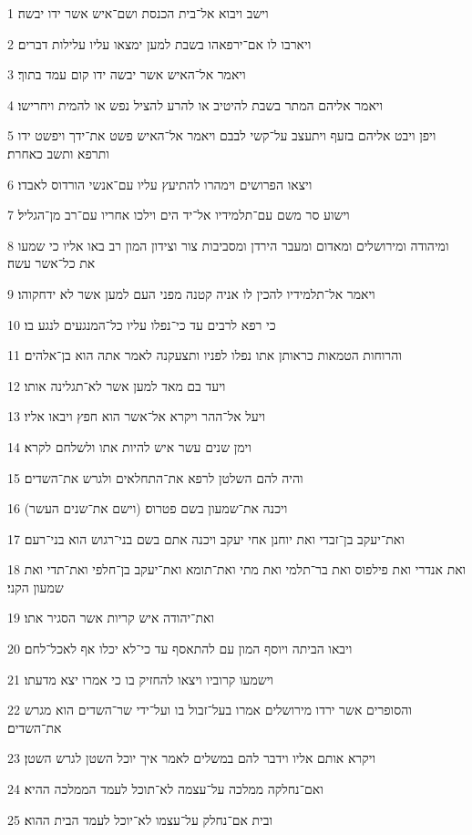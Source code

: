 \par 1 וישב ויבוא אל־בית הכנסת ושם־איש אשר ידו יבשה׃
\par 2 ויארבו לו אם־ירפאהו בשבת למען ימצאו עליו עלילות דברים׃
\par 3 ויאמר אל־האיש אשר יבשה ידו קום עמד בתוך׃
\par 4 ויאמר אליהם המתר בשבת להיטיב או להרע להציל נפש או להמית ויחרישו׃
\par 5 ויפן ויבט אליהם בזעף ויתעצב על־קשי לבבם ויאמר אל־האיש פשט את־ידך ויפשט ידו ותרפא ותשב כאחרת׃
\par 6 ויצאו הפרושים וימהרו להתיעץ עליו עם־אנשי הורדוס לאבדו׃
\par 7 וישוע סר משם עם־תלמידיו אל־יד הים וילכו אחריו עם־רב מן־הגליל׃
\par 8 ומיהודה ומירושלים ומאדום ומעבר הירדן ומסביבות צור וצידון המון רב באו אליו כי שמעו את כל־אשר עשה׃
\par 9 ויאמר אל־תלמידיו להכין לו אניה קטנה מפני העם למען אשר לא ידחקוהו׃
\par 10 כי רפא לרבים עד כי־נפלו עליו כל־המנגעים לנגע בו׃
\par 11 והרוחות הטמאות כראותן אתו נפלו לפניו ותצעקנה לאמר אתה הוא בן־אלהים׃
\par 12 ויעד בם מאד למען אשר לא־תגלינה אותו׃
\par 13 ויעל אל־ההר ויקרא אל־אשר הוא חפץ ויבאו אליו׃
\par 14 וימן שנים עשר איש להיות אתו ולשלחם לקרא׃
\par 15 והיה להם השלטן לרפא את־התחלאים ולגרש את־השדים׃
\par 16 (וישם את־שנים העשר) ויכנה את־שמעון בשם פטרוס׃
\par 17 ואת־יעקב בן־זבדי ואת יוחנן אחי יעקב ויכנה אתם בשם בני־רגוש הוא בני־רעם׃
\par 18 ואת אנדרי ואת פילפוס ואת בר־תלמי ואת מתי ואת־תומא ואת־יעקב בן־חלפי ואת־תדי ואת שמעון הקני׃
\par 19 ואת־יהודה איש קריות אשר הסגיר אתו׃
\par 20 ויבאו הביתה ויוסף המון עם להתאסף עד כי־לא יכלו אף לאכל־לחם׃
\par 21 וישמעו קרוביו ויצאו להחזיק בו כי אמרו יצא מדעתו׃
\par 22 והסופרים אשר ירדו מירושלים אמרו בעל־זבול בו ועל־ידי שר־השדים הוא מגרש את־השדים׃
\par 23 ויקרא אותם אליו וידבר להם במשלים לאמר איך יוכל השטן לגרש השטן׃
\par 24 ואם־נחלקה ממלכה על־עצמה לא־תוכל לעמד הממלכה ההיא׃
\par 25 ובית אם־נחלק על־עצמו לא־יוכל לעמד הבית ההוא׃
